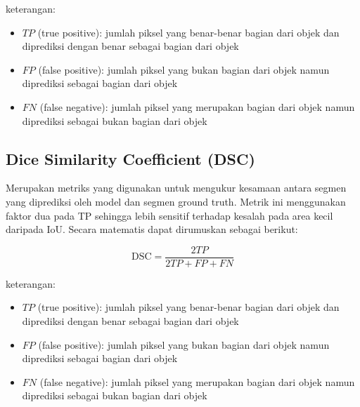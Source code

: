 \noindent
keterangan:
\begin{itemize}
	\item $TP$ (true positive): jumlah piksel yang benar-benar bagian dari objek dan diprediksi dengan benar sebagai bagian dari objek
	\item $FP$ (false positive): jumlah piksel yang bukan bagian dari objek namun diprediksi sebagai bagian dari objek
	\item $FN$ (false negative): jumlah piksel yang merupakan bagian dari objek namun diprediksi sebagai bukan bagian dari objek
\end{itemize}

\subsection{Dice Similarity Coefficient (DSC)}

\noindent Merupakan metriks yang digunakan untuk mengukur kesamaan antara segmen yang diprediksi oleh model dan segmen ground truth\cite{jiang_iu-net_2023}. Metrik ini menggunakan faktor dua pada TP sehingga lebih sensitif terhadap kesalah pada area kecil daripada IoU. Secara matematis dapat dirumuskan sebagai berikut:

\begin{equation}
	\text{DSC} =  \frac{2TP}{2TP + FP + FN}
\end{equation}

\noindent
keterangan:
\begin{itemize}
	\item $TP$ (true positive): jumlah piksel yang benar-benar bagian dari objek dan diprediksi dengan benar sebagai bagian dari objek
	\item $FP$ (false positive): jumlah piksel yang bukan bagian dari objek namun diprediksi sebagai bagian dari objek
	\item $FN$ (false negative): jumlah piksel yang merupakan bagian dari objek namun diprediksi sebagai bukan bagian dari objek
\end{itemize}


